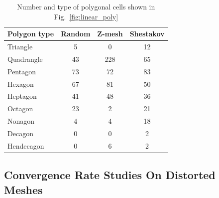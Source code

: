 \documentclass[preprint,10pt]{elsarticle}
\newcommand{\fig}[1]{Fig.~\ref{#1}}                      %
\begin{document}
\begin{table}[htbp]
	\centering
		\begin{tabular}{|l||c|c|c|}
		\hline
		Polygon type       &Random              & Z-mesh & Shestakov  \\ \hline\hline
Triangle  &   5 &  0 & 12 \\ \hline
Quadrangle&  43 & 228& 65 \\ \hline
Pentagon  &  73 & 72 & 83 \\ \hline
Hexagon   &  67 & 81 & 50 \\ \hline
Heptagon  &  41 & 48 & 36 \\ \hline
Octagon   &  23 & 2  & 21 \\ \hline
Nonagon   &   4 & 4  & 18 \\ \hline
Decagon   &   0 & 0  &  2 \\ \hline
Hendecagon&   0 & 6  &  2 \\ \hline		
		\end{tabular}
	\caption{Number and type of polygonal cells shown in \fig{fig:linear_poly}}
	\label{tab:poly_cell_types_linear_poly}
\end{table}


\subsection{Convergence Rate Studies On Distorted Meshes}
\end{document}
